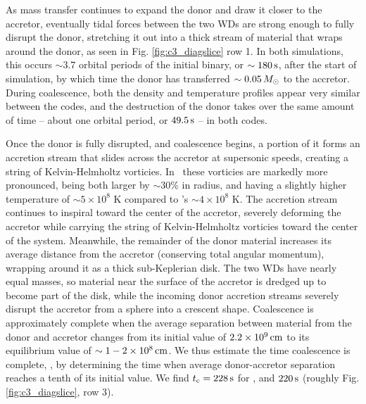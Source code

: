 As mass transfer continues to expand the donor and draw it closer to the accretor, eventually tidal forces between the two WDs are strong enough to fully disrupt the donor, stretching it out into a thick stream of material that wraps around the donor, as seen in Fig. \ref{fig:c3_diagslice} row 1.  In both simulations, this occurs $\sim3.7$ orbital periods of the initial binary, or $\sim180\,\mathrm{s}$, after the start of simulation, by which time the donor has transferred $\sim0.05\,\Msun$ to the accretor.  During coalescence, both the density and temperature profiles appear very similar between the codes, and the destruction of the donor takes over the same amount of time -- about one orbital period, or $49.5\,\mathrm{s}$ -- in both codes.


Once the donor is fully disrupted, and coalescence begins, a portion of it forms an accretion stream that slides across the accretor at supersonic speeds, creating a string of Kelvin-Helmholtz vorticies.  In \arepo\ these vorticies are markedly more pronounced, being both larger by $\sim30$\% in radius, and having a slightly higher temperature of $\sim5\times10^8$ K compared to \gasoline's $\sim4\times10^8$ K.  The accretion stream continues to inspiral toward the center of the accretor, severely deforming the accretor while carrying the string of Kelvin-Helmholtz vorticies toward the center of the system.  Meanwhile, the remainder of the donor material increases its average distance from the accretor (conserving total angular momentum), wrapping around it as a thick sub-Keplerian disk.  The two WDs have nearly equal masses, so material near the surface of the accretor is dredged up to become part of the disk, while the incoming donor accretion streams severely disrupt the accretor from a sphere into a crescent shape.  Coalescence is approximately complete when the average separation between material from the donor and accretor changes from its initial value of $2.2\times10^9\,\mathrm{cm}$ to its equilibrium value of $\sim1-2\times10^8\,\mathrm{cm}$.  We thus estimate the time coalescence is complete, \tcoal, by determining the time when average donor-accretor separation reaches a tenth of its initial value.  We find $\tcoal = 228\,\mrm{s}$ for \gasoline, and $220\,\mathrm{s}$ (roughly Fig. \ref{fig:c3_diagslice}, row 3).


